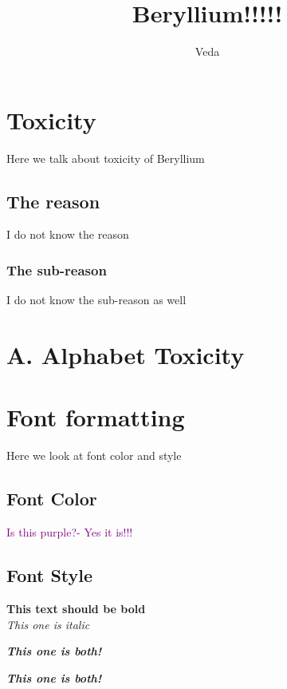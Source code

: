 \documentclass[12pt,a4paper]{article}
\title{Beryllium!!!!!}
\author{Veda}
\affil{University of California Los Angeles}
\date{}
\begin{document}
    \maketitle
    \section{Toxicity}
    Here we talk about toxicity of Beryllium
    \subsection{The reason} %
    I do not know the reason

    \subsubsection{The sub-reason} %
    I do not know the sub-reason as well


     \section*{A. Alphabet Toxicity}


\section{Font formatting}
Here we look at font color and style
\subsection{Font Color}
\textcolor{purple}{Is this purple?- Yes it is!!!}
\subsection{Font Style}
\textbf{This text should be bold}\\ %
\textit{This one is italic}

\textbf{\textit{This one is both!}}

\noindent \textbf{\textit{This one is both!}}
\end{document}
